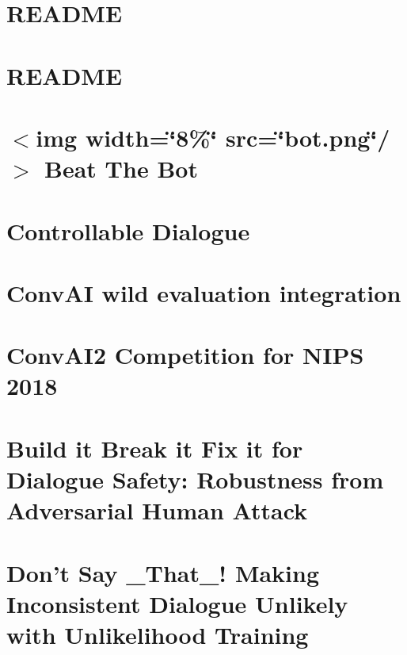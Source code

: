 \documentclass[twoside]{book}
\newcommand{\+}{\discretionary{\mbox{\scriptsize$\hookleftarrow$}}{}{}}
\begin{document}
\chapter{R\+E\+A\+D\+ME}
\label{md_parlai_zoo_pretrained_transformers_README}

\chapter{R\+E\+A\+D\+ME}
\label{md_parlai_zoo_README}

\chapter{$<$img width=\char`\"{}8\%\char`\"{} src=\char`\"{}bot.\+png\char`\"{}/$>$ Beat The Bot}
\label{md_projects_beat_the_bot_README}

\chapter{Controllable Dialogue}
\label{md_projects_controllable_dialogue_README}

\chapter{Conv\+AI \textquotesingle{}wild\textquotesingle{} evaluation integration}
\label{md_projects_convai_README}

\chapter{Conv\+A\+I2 Competition for N\+I\+PS 2018}
\label{md_projects_convai2_README}

\chapter{Build it Break it Fix it for Dialogue Safety\+: Robustness from Adversarial Human Attack}
\label{md_projects_dialogue_safety_README}

\chapter{Don’t Say \+\_\+\+That\+\_\+! Making Inconsistent Dialogue Unlikely with Unlikelihood Training}
\label{md_projects_dialogue_unlikelihood_README}

\end{document}
